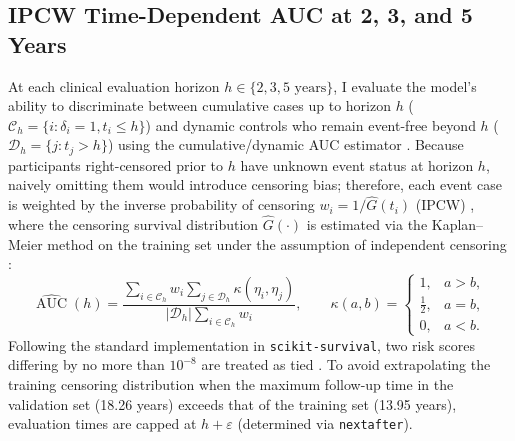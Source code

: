 \subsection{IPCW Time-Dependent AUC at 2, 3, and 5 Years}
At each clinical evaluation horizon $h \in \{2, 3, 5\text{ years}\}$, I evaluate the model's ability to discriminate between cumulative cases up to horizon $h$ ($\mathcal C_h=\{i:\delta_i=1,t_i\leq h\}$) and dynamic controls who remain event-free beyond $h$ ($\mathcal D_h=\{j:t_j>h\}$) using the cumulative/dynamic AUC estimator \cite{hung2010time}. Because participants right-censored prior to $h$ have unknown event status at horizon $h$, naively omitting them would introduce censoring bias; therefore, each event case is weighted by the inverse probability of censoring $w_i = 1/\widehat G(t_i)$ (IPCW) \cite{polsterl2020scikit,hung2010time}, where the censoring survival distribution $\widehat G(\cdot)$ is estimated via the Kaplan--Meier method on the training set under the assumption of independent censoring \cite{sksurvauc}:
\begin{equation}
 \widehat{\operatorname{AUC}}(h)=
 \frac{\displaystyle\sum_{i\in\mathcal C_h}w_i
 \sum_{j\in\mathcal D_h}\kappa(\eta_i,\eta_j)}
 {\displaystyle |\mathcal D_h|\sum_{i\in\mathcal C_h}w_i},
 \qquad
 \kappa(a,b)=\begin{cases}
 1,&a>b,\\
 \tfrac12,&a=b,\\
 0,&a<b.
 \end{cases}
 \label{eq:ipcw-auc}
\end{equation}
Following the standard implementation in \texttt{scikit-survival}, two risk scores differing by no more than $10^{-8}$ are treated as tied \cite{sksurvauc}. To avoid extrapolating the training censoring distribution when the maximum follow-up time in the validation set (18.26 years) exceeds that of the training set (13.95 years), evaluation times are capped at $h+\varepsilon$ (determined via \texttt{nextafter}).
